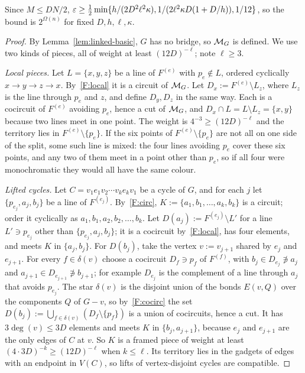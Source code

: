 Since $M\le DN/2$, $\varepsilon\ge\frac12\min\{h/(2D^2\ell^2\kappa),1/(2\ell^2\kappa D(1+D/h)),1/12\}$, so the bound is $2^{\Omega(n)}$ for fixed $D,h,\ell,\kappa$.

\begin{proof}
By Lemma~\ref{lem:linked-basic}, $G$ has no bridge, so $\mathcal{M}_G$ is defined. We use two kinds of pieces, all of weight at least $(12D)^{-\ell}$; note $\ell\ge3$.

\emph{Local pieces.} Let $L=\{x,y,z\}$ be a line of $F^{(e)}$ with $p_e\notin L$, ordered cyclically $x\to y\to z\to x$. By~\ref{F:local} it is a circuit of $\mathcal{M}_G$. Let $D_x:=F^{(e)}\setminus L_z$, where $L_z$ is the line through $p_e$ and $z$, and define $D_y,D_z$ in the same way. Each is a cocircuit of $F^{(e)}$ avoiding $p_e$, hence a cut of $\mathcal{M}_G$, and $D_x\cap L=L\setminus L_z=\{x,y\}$ because two lines meet in one point. The weight is $4^{-3}\ge(12D)^{-\ell}$ and the territory lies in $F^{(e)}\setminus\{p_e\}$. If the six points of $F^{(e)}\setminus\{p_e\}$ are not all on one side of the split, some such line is mixed: the four lines avoiding $p_e$ cover these six points, and any two of them meet in a point other than $p_e$, so if all four were monochromatic they would all have the same colour.

\emph{Lifted cycles.} Let $C=v_1e_1v_2\cdots v_ke_kv_1$ be a cycle of $G$, and for each $j$ let $\{p_{e_j},a_j,b_j\}$ be a line of $F^{(e_j)}$. By~\ref{F:circ}, $K:=\{a_1,b_1,\dots,a_k,b_k\}$ is a circuit; order it cyclically as $a_1,b_1,a_2,b_2,\dots,b_k$. Let $D(a_j):=F^{(e_j)}\setminus L'$ for a line $L'\ni p_{e_j}$ other than $\{p_{e_j},a_j,b_j\}$; it is a cocircuit by~\ref{F:local}, has four elements, and meets $K$ in $\{a_j,b_j\}$. For $D(b_j)$, take the vertex $v:=v_{j+1}$ shared by $e_j$ and $e_{j+1}$. For every $f\in\delta(v)$ choose a cocircuit $D_f\ni p_f$ of $F^{(f)}$, with $b_j\in D_{e_j}\not\ni a_j$ and $a_{j+1}\in D_{e_{j+1}}\not\ni b_{j+1}$; for example $D_{e_j}$ is the complement of a line through $a_j$ that avoids $p_{e_j}$. The star $\delta(v)$ is the disjoint union of the bonds $E(v,Q)$ over the components $Q$ of $G-v$, so by~\ref{F:cocirc} the set $D(b_j):=\bigcup_{f\in\delta(v)}(D_f\setminus\{p_f\})$ is a union of cocircuits, hence a cut. It has $3\deg(v)\le3D$ elements and meets $K$ in $\{b_j,a_{j+1}\}$, because $e_j$ and $e_{j+1}$ are the only edges of $C$ at $v$. So $K$ is a framed piece of weight at least $(4\cdot3D)^{-k}\ge(12D)^{-\ell}$ when $k\le\ell$. Its territory lies in the gadgets of edges with an endpoint in $V(C)$, so lifts of vertex-disjoint cycles are compatible.


\end{proof}
